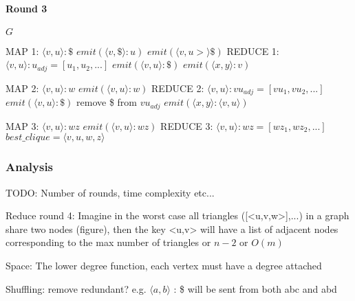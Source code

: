 \documentclass{article}
\begin{document}
\paragraph{Round 3}


\begin{algorithm}
\caption{$mr\_strong\_4clique\_finder$}
\begin{algorithmic}
\REQUIRE $G$
	
\REQUIRE MAP 1: $\langle v,u\rangle :\$$
		\STATE $emit(\langle v,\$\rangle :u)$
		\STATE $emit(\langle v,u>\rangle \$)$
	\ENDIF
\REQUIRE REDUCE 1: $\langle v,u\rangle :u_{adj} = [u_1,u_2,...]$
		\STATE $emit(\langle v,u \rangle:\$)$
					\STATE $emit(\langle x,y\rangle :v)$
				\ENDIF
			\ENDFOR
		\ENDFOR
	\ENDIF

\REQUIRE MAP 2: $\langle v,u\rangle :w$
	\STATE $emit(\langle v,u\rangle :w)$
\REQUIRE REDUCE 2: $\langle v,u\rangle : vu_{adj} = [vu_1,vu_2,...]$
		\STATE $emit(\langle v,u\rangle : \$)$
		\STATE remove \$ from $vu_{adj}$
	\ENDIF
				\STATE $emit(\langle x,y\rangle :\langle v,u\rangle)$
			\ENDIF
		\ENDFOR
	\ENDFOR

\REQUIRE MAP 3: $\langle v,u\rangle :wz$
	\STATE $emit(\langle v,u\rangle :wz)$
\REQUIRE REDUCE 3: $\langle v,u\rangle :wz = [wz_1,wz_2,...]$
				\STATE $best\_clique = \langle v,u,w,z\rangle$
			\ENDIF
		\ENDFOR
	\ENDIF
\end{algorithmic}
\end{algorithm}

\subsubsection{Analysis}
TODO: Number of rounds, time complexity etc...

Reduce round 4: Imagine in the worst case all triangles ([<u,v,w>],...) in a graph share two nodes (figure), then the key <u,v> will have a list of adjacent nodes corresponding to the max number of triangles or $n-2$ or $O(m)$

Space: The lower degree function, each vertex must have a degree attached

Shuffling: remove redundant? e.g. $\langle a,b\rangle$ : \$ will be sent from both abc and abd
\end{document}
